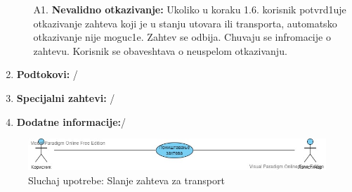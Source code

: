 \begin{enumerate}
\begin{enumerate}
                \item [A1.] \textbf{Nevalidno otkazivanje: }
                Ukoliko u koraku 1.6. korisnik potvrd1uje otkazivanje zahteva koji je u stanju utovara ili transporta, automatsko otkazivanje nije moguc1e. Zahtev se odbija. Chuvaju se infromacije o zahtevu. Korisnik se obaveshtava o neuspelom otkazivanju.
            \end{enumerate}
        
    \item \textbf{Podtokovi:} /
    \item \textbf{Specijalni zahtevi:} /
    \item \textbf{Dodatne informacije:}/
    
\end{enumerate}



\begin{figure}[h!]
    \includegraphics[scale=0.4]{Slike/SUotkazivanjeZahteva.jpg}
    \centering
    \caption{Sluchaj upotrebe: Slanje zahteva za transport}
    \label{dsuponistavanje}
\end{figure}    


